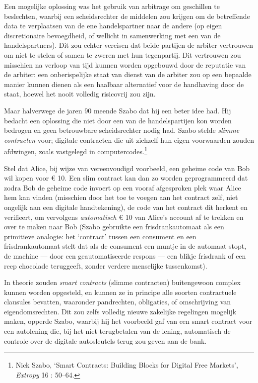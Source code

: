 \documentclass[smalldemyvopaper,11pt,twoside,onecolumn,openright,extrafontsizes,hidelinks]{memoir}
\begin{document}
Een mogelijke oplossing was het gebruik van arbitrage om geschillen te
beslechten, waarbij een scheidsrechter de middelen zou krijgen om de
betreffende data te verplaatsen van de ene handelspartner naar de andere
(op eigen discretionaire bevoegdheid, of wellicht in samenwerking met
een van de handelspartners). Dit zou echter vereisen dat beide partijen
de arbiter vertrouwen om niet te stelen of samen te zweren met hun
tegenpartij. Dit vertrouwen zou misschien na verloop van tijd kunnen
worden opgebouwd door de reputatie van de arbiter: een onberispelijke
staat van dienst van de arbiter zou op een bepaalde manier kunnen dienen
als een haalbaar alternatief voor de handhaving door de staat, hoewel
het nooit volledig risicovrij zou zijn.

Maar halverwege de jaren 90 meende Szabo dat hij een beter idee had. Hij
bedacht een oplossing die niet door een van de handelspartijen kon
worden bedrogen en geen betrouwbare scheidsrechter nodig had. Szabo
stelde \emph{slimme contracten} voor; digitale contracten die uit
zichzelf hun eigen voorwaarden zouden afdwingen, zoals vastgelegd in
computercodes.\footnote{Nick Szabo, `Smart Contracts: Building Blocks
  for Digital Free Markets', \emph{Extropy} 16 : 50--64.}

Stel dat Alice, bij wijze van vereenvoudigd voorbeeld, een geheime code
van Bob wil kopen voor € 10. Een slim contract kan dan zo worden
geprogrammeerd dat zodra Bob de geheime code invoert op een vooraf
afgesproken plek waar Alice hem kan vinden (misschien door het toe te
voegen aan het contract zelf, niet ongelijk aan een digitale
handtekening), de code van het contract dit herkent en verifieert, om
vervolgens \emph{automatisch} € 10 van Alice's account af te trekken en
over te maken naar Bob (Szabo gebruikte een frisdrankautomaat als een
primitieve analogie: het `contract' tussen een consument en een
frisdrankautomaat stelt dat als de consument een muntje in de automaat
stopt, de machine --- door een geautomatiseerde respons --- een blikje
frisdrank of een reep chocolade teruggeeft, zonder verdere menselijke
tussenkomst).

In theorie zouden \emph{smart contracts} (slimme contracten)
buitengewoon complex kunnen worden opgesteld, en kunnen ze in principe
alle soorten contractuele clausules bevatten, waaronder pandrechten,
obligaties, of omschrijving van eigendomsrechten. Dit zou zelfs volledig
nieuwe zakelijke regelingen mogelijk maken, opperde Szabo, waarbij hij
het voorbeeld gaf van een smart contract voor een autolening die, bij
het niet terugbetalen van de lening, automatisch de controle over de
digitale autosleutels terug zou geven aan de bank.
\end{document}
